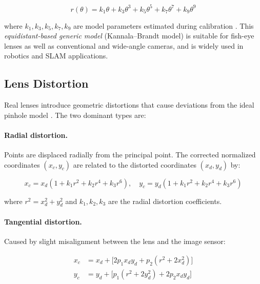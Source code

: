 \begin{equation}
    r(\theta) = k_1\theta + k_3\theta^3 + k_5\theta^5 + k_7\theta^7 + k_9\theta^9
    \label{eq:fisheye_proj}
\end{equation}

\noindent where $k_1, k_3, k_5, k_7, k_9$ are model parameters estimated
during calibration \cite{kannala2006generic}. This \textit{equidistant-based
generic model} (Kannala--Brandt model) is suitable for fish-eye lenses as well
as conventional and wide-angle cameras, and is widely used in robotics and SLAM
applications.

\subsection{Lens Distortion}
\label{subsec:distortion}

Real lenses introduce geometric distortions that cause deviations from the ideal
pinhole model \cite{hartley2004multiple, bradski2008learning}. The two dominant
types are:

\paragraph{Radial distortion.} Points are displaced radially from the principal
point. The corrected normalized coordinates $(x_c, y_c)$ are related to the
distorted coordinates $(x_d, y_d)$ by:

\begin{equation}
    x_c = x_d (1 + k_1 r^2 + k_2 r^4 + k_3 r^6), \quad
    y_c = y_d (1 + k_1 r^2 + k_2 r^4 + k_3 r^6)
    \label{eq:radial_distortion}
\end{equation}

\noindent where $r^2 = x_d^2 + y_d^2$ and $k_1, k_2, k_3$ are the radial
distortion coefficients.

\paragraph{Tangential distortion.} Caused by slight misalignment between the
lens and the image sensor:

\begin{equation}
    \begin{aligned}
    x_c &= x_d + \bigl[2p_1 x_d y_d + p_2(r^2 + 2x_d^2)\bigr] \\
    y_c &= y_d + \bigl[p_1(r^2 + 2y_d^2) + 2p_2 x_d y_d\bigr]
    \end{aligned}
    \label{eq:tangential_distortion}
\end{equation}

